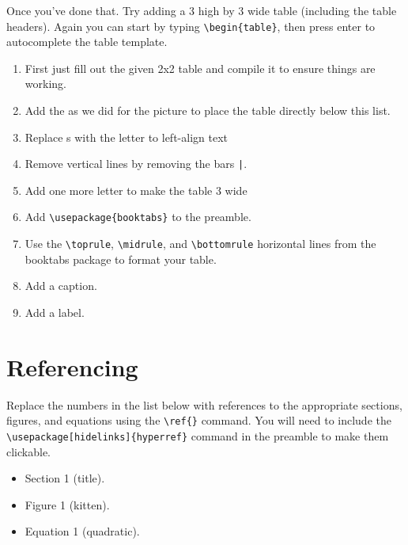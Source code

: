 
        Once you've done that. Try adding a 3 high by 3 wide table (including the table headers). Again you can start by typing
        \verb"\begin{table}", then press enter to autocomplete the table template.
        \begin{enumerate}
            \item First just fill out the given 2x2 table and compile it to ensure things are working.
            \item Add the  as we did for the picture to place the table directly below this list.
            \item Replace s with the letter  to left-align text
            \item Remove vertical lines by removing the bars \verb"|".
            \item Add one more letter  to make the table 3 wide
            \item Add \verb"\usepackage{booktabs}" to the preamble.
            \item Use the \verb"\toprule", \verb"\midrule", and \verb"\bottomrule" horizontal lines from the booktabs package to format your table.
            \item Add a caption.
            \item Add a label.
        \end{enumerate}


    \section{Referencing}
        Replace the numbers in the list below with references to the appropriate sections, figures, and equations using the \verb"\ref{}" command. You will need to include the \verb"\usepackage[hidelinks]{hyperref}" command in the preamble to make them clickable.


        \begin{itemize}
            \item Section 1 (title).
            \item Figure 1 (kitten).
            \item Equation 1 (quadratic).
        \end{itemize}
        

        

        
        
    


